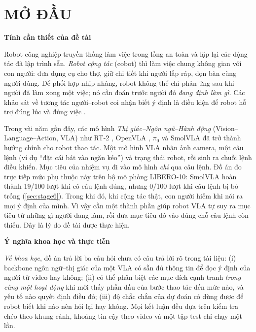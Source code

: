 \documentclass[a4paper,oneside]{report}
\newcommand{\unchapter}[1]{%
  \chapter*{#1}%
  \addcontentsline{toc}{chapter}{#1}}
\newcommand{\mucnho}[1]{\par\vspace{4pt}\noindent\textbf{#1}\par\nobreak}
\begin{document}
\cleardoublepage
{}
\setcounter{page}{1}

\unchapter{MỞ ĐẦU}
\label{chap:modau}

\mucnho{Tính cần thiết của đề tài}

Robot công nghiệp truyền thống làm việc trong lồng an toàn và lặp lại các động tác đã lập trình sẵn. \textit{Robot cộng tác} (cobot) thì làm việc chung không gian với con người: đưa dụng cụ cho thợ, giữ chi tiết khi người lắp ráp, dọn bàn cùng người dùng. Để phối hợp nhịp nhàng, robot không thể chỉ phản ứng sau khi người đã làm xong một việc; nó cần đoán trước người đó \textit{đang định làm gì}. Các khảo sát về tương tác người--robot coi nhận biết ý định là điều kiện để robot hỗ trợ đúng lúc và đúng việc \citep{losey2018review}.

Trong vài năm gần đây, các mô hình \textit{Thị giác--Ngôn ngữ--Hành động} (Vision--Language--Action, VLA) như RT-2 \citep{zitkovich2023rt2}, OpenVLA \citep{kim2024openvla}, $\pi_0$ \citep{black2024pi0} và SmolVLA \citep{shukor2025smolvla} đã trở thành hướng chính cho robot thao tác. Một mô hình VLA nhận ảnh camera, một câu lệnh (ví dụ ``đặt cái bát vào ngăn kéo'') và trạng thái robot, rồi sinh ra chuỗi lệnh điều khiển. Mục tiêu của nhiệm vụ đi vào mô hình \textit{chỉ} qua câu lệnh. Đồ án đo trực tiếp mức phụ thuộc này trên bộ mô phỏng LIBERO-10: SmolVLA hoàn thành 19/100 lượt khi có câu lệnh đúng, nhưng 0/100 lượt khi câu lệnh bị bỏ trống (\cref{sec:stage6}). Trong khi đó, khi cộng tác thật, con người hiếm khi nói ra mọi ý định của mình. Vì vậy cần một thành phần giúp robot VLA tự suy ra mục tiêu từ những gì người đang làm, rồi đưa mục tiêu đó vào đúng chỗ câu lệnh còn thiếu. Đây là lý do đề tài được thực hiện.

\mucnho{Ý nghĩa khoa học và thực tiễn}

\textit{Về khoa học}, đồ án trả lời ba câu hỏi chưa có câu trả lời rõ trong tài liệu: (i) backbone ngôn ngữ--thị giác của một VLA có sẵn đủ thông tin để đọc ý định của người từ video hay không; (ii) có thể phân biệt các mục đích cạnh tranh \textit{trong cùng một hoạt động} khi mới thấy phần đầu của bước thao tác đến mức nào, và yếu tố nào quyết định điều đó; (iii) độ chắc chắn của dự đoán có dùng được để robot biết khi nào nên hỏi lại hay không. Mọi kết luận đều dựa trên kiểm tra chéo theo khung cảnh, khoảng tin cậy theo video và một tập test chỉ chạy một lần.
\end{document}
